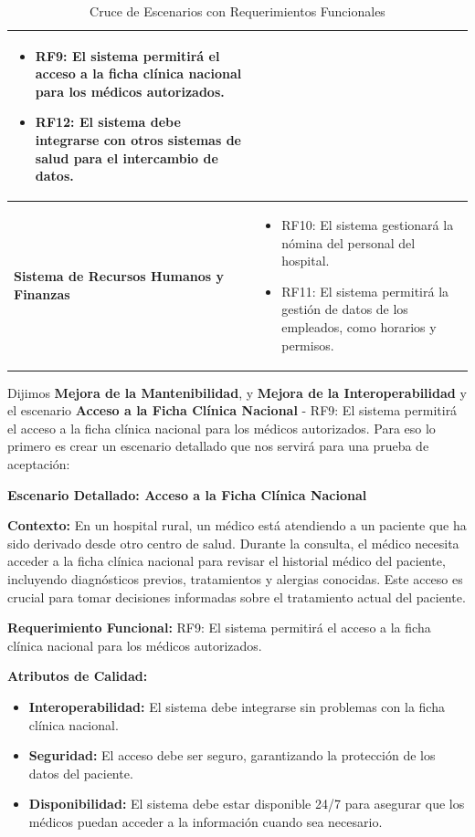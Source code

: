 \begin{table}[h]
\begin{tabular}{|l|p{10cm}|}
\begin{itemize}
        \item RF9: El sistema permitirá el acceso a la ficha clínica nacional para los médicos autorizados.
        \item RF12: El sistema debe integrarse con otros sistemas de salud para el intercambio de datos.
    \end{itemize} \\ \hline
    \textbf{Sistema de Recursos Humanos y Finanzas} & 
    \begin{itemize}
        \item RF10: El sistema gestionará la nómina del personal del hospital.
        \item RF11: El sistema permitirá la gestión de datos de los empleados, como horarios y permisos.
    \end{itemize} \\ \hline
    \end{tabular}
    \caption{Cruce de Escenarios con Requerimientos Funcionales}
    \label{tab:escenarios_requerimientos}
    \end{table}

Dijimos \textbf{Mejora de la Mantenibilidad}, y \textbf{Mejora de la Interoperabilidad} y el escenario  \textbf{Acceso a la Ficha Clínica Nacional} - RF9: El sistema permitirá el acceso a la ficha clínica nacional para los médicos autorizados. Para eso lo primero es crear un escenario detallado que nos servirá para una prueba de aceptación: 

\textbf{Escenario Detallado: Acceso a la Ficha Clínica Nacional}

\textbf{Contexto:} En un hospital rural, un médico está atendiendo a un paciente que ha sido derivado desde otro centro de salud. Durante la consulta, el médico necesita acceder a la ficha clínica nacional para revisar el historial médico del paciente, incluyendo diagnósticos previos, tratamientos y alergias conocidas. Este acceso es crucial para tomar decisiones informadas sobre el tratamiento actual del paciente.

\textbf{Requerimiento Funcional:} RF9: El sistema permitirá el acceso a la ficha clínica nacional para los médicos autorizados.

\textbf{Atributos de Calidad:}
\begin{itemize}
    \item \textbf{Interoperabilidad:} El sistema debe integrarse sin problemas con la ficha clínica nacional.
    \item \textbf{Seguridad:} El acceso debe ser seguro, garantizando la protección de los datos del paciente.
    \item \textbf{Disponibilidad:} El sistema debe estar disponible 24/7 para asegurar que los médicos puedan acceder a la información cuando sea necesario.
\end{itemize}

